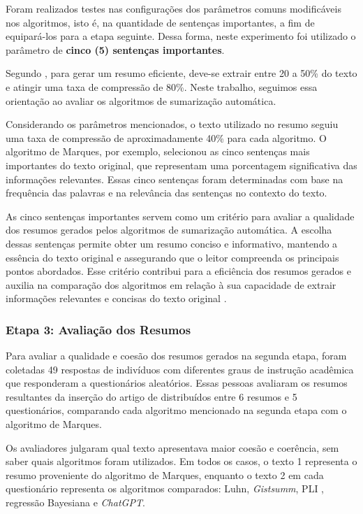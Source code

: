 Foram realizados testes nas configurações dos parâmetros comuns modificáveis nos algoritmos, isto é, na quantidade de sentenças importantes, a fim de equipará-los para a etapa seguinte. Dessa forma, neste experimento foi utilizado o parâmetro de \textbf{cinco (5) sentenças importantes}.

Segundo , para gerar um resumo eficiente, deve-se extrair entre 20 a 50\% do texto e atingir uma taxa de compressão de 80\%. Neste trabalho, seguimos essa orientação ao avaliar os algoritmos de sumarização automática.

Considerando os parâmetros mencionados, o texto utilizado no resumo seguiu uma taxa de compressão de aproximadamente 40\% para cada algoritmo. O algoritmo de Marques, por exemplo, selecionou as cinco sentenças mais importantes do texto original, que representam uma porcentagem significativa das informações relevantes. Essas cinco sentenças foram determinadas com base na frequência das palavras e na relevância das sentenças no contexto do texto.

As cinco sentenças importantes servem como um critério para avaliar a qualidade dos resumos gerados pelos algoritmos de sumarização automática. A escolha dessas sentenças permite obter um resumo conciso e informativo, mantendo a essência do texto original e assegurando que o leitor compreenda os principais pontos abordados. Esse critério contribui para a eficiência dos resumos gerados e auxilia na comparação dos algoritmos em relação à sua capacidade de extrair informações relevantes e concisas do texto original \cite{oliveira2022composiccao}.

\subsubsection{Etapa 3: Avaliação dos Resumos}
\label{chap:terceira-etapa}

Para avaliar a qualidade e coesão dos resumos gerados na segunda etapa, foram coletadas 49 respostas 
de indivíduos com diferentes graus de instrução acadêmica que responderam a questionários aleatórios. Essas pessoas avaliaram os resumos resultantes da inserção do artigo de  distribuídos entre 6 resumos e 5 questionários, comparando cada algoritmo mencionado na segunda etapa com o algoritmo de Marques.

Os avaliadores julgaram qual texto apresentava maior coesão e coerência, sem saber quais algoritmos foram utilizados. Em todos os casos, o texto 1 representa o resumo proveniente do algoritmo de Marques, enquanto o texto 2 em cada questionário representa os algoritmos comparados: Luhn, \textit{Gistsumm}, PLI \cite{oliveira2018sumarizaccao}, regressão Bayesiana e \textit{ChatGPT}.

